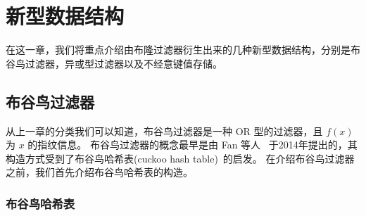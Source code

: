 
\chapter{新型数据结构}\label{chp:data_structure}

在这一章，我们将重点介绍由布隆过滤器衍生出来的几种新型数据结构，分别是布谷鸟过滤器，异或型过滤器以及不经意键值存储。

\section{布谷鸟过滤器}

从上一章的分类我们可以知道，布谷鸟过滤器是一种 OR 型的过滤器，且 $f(x)$ 为 $x$ 的指纹信息。
布谷鸟过滤器的概念最早是由 Fan 等人~\cite{fan2014cuckoo} 于2014年提出的，其构造方式受到了布谷鸟哈希表(cuckoo hash table)~\cite{pagh2004cuckoo}的启发。
在介绍布谷鸟过滤器之前，我们首先介绍布谷鸟哈希表的构造。

\subsection{布谷鸟哈希表}

